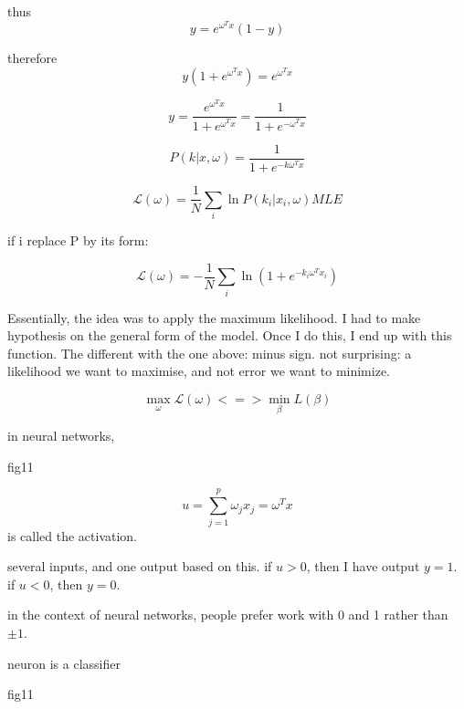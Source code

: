 \documentclass[a4paper]{tufte-book}
\begin{document}
thus
\begin{equation}
    y = e^{\omega^T x} (1-y)
\end{equation}

therefore
\begin{equation}
    y(1+e^{\omega^T x}) = e^{\omega^T x}
\end{equation}

\begin{equation}
    y = \frac{e^{\omega^T x}}{1+e^{\omega^Tx}} = \frac{1}{1+e^{-\omega^T x}}
\end{equation}

\begin{equation}
    P(k|x,\omega) = \frac{1}{1+e^{-k\omega^T x}}
\end{equation}


\begin{equation}
    \mathcal{L}(\omega) = \frac{1}{N} \sum_i \ln P(k_i |x_i,\omega) MLE
\end{equation}

if i replace P by its form:

\begin{equation}
    \mathcal{L}(\omega) = - \frac{1}{N} \sum_i \ln (1 + e^{-k_i \omega^T x_i})
\end{equation}

Essentially, the idea was to apply the maximum likelihood. I had to make 
hypothesis on the general form of the model. Once I do this, I
end up with this function. The different with the one above:  minus sign.
not surprising: a likelihood we want to maximise, and not error we want to
minimize.

\begin{equation}
    \max_\omega \mathcal{L}(\omega) <=> \min_\beta L(\beta)
\end{equation}

in neural networks,

fig11

\begin{equation}
    u = \sum_{j=1}^p \omega_j x_j = \omega^T x 
\end{equation}
is called the activation.

several inputs, and one output based on this.
if $u>0$, then I have output $y=1$.
if $u<0$, then $y=0$.

in the context of neural networks, people prefer work with 0 and 1 rather than
$\pm 1$.

neuron is a classifier

fig11
\end{document}
